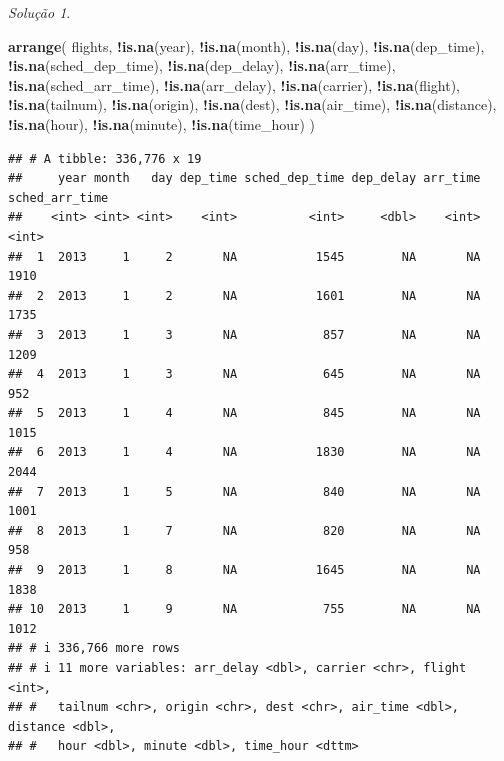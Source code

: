 \documentclass[
]{latex/krantz}
\newenvironment{Shaded}{\begin{snugshade}}{\end{snugshade}}
\newcommand{\FunctionTok}[1]{\textcolor[rgb]{0.13,0.29,0.53}{\textbf{#1}}}
\newcommand{\NormalTok}[1]{#1}
\newcommand{\SpecialCharTok}[1]{\textcolor[rgb]{0.81,0.36,0.00}{\textbf{#1}}}
\theoremstyle{definition}
\theoremstyle{definition}
\theoremstyle{definition}
\theoremstyle{definition}
\theoremstyle{remark}
\newtheorem*{solution}{Solução}
\begin{document}
\begin{solution}
\leavevmode

\begin{Shaded}
\begin{Highlighting}[]
\FunctionTok{arrange}\NormalTok{(}
\NormalTok{  flights, }
  \SpecialCharTok{!}\FunctionTok{is.na}\NormalTok{(year), }
  \SpecialCharTok{!}\FunctionTok{is.na}\NormalTok{(month), }
  \SpecialCharTok{!}\FunctionTok{is.na}\NormalTok{(day), }
  \SpecialCharTok{!}\FunctionTok{is.na}\NormalTok{(dep\_time), }
  \SpecialCharTok{!}\FunctionTok{is.na}\NormalTok{(sched\_dep\_time), }
  \SpecialCharTok{!}\FunctionTok{is.na}\NormalTok{(dep\_delay), }
  \SpecialCharTok{!}\FunctionTok{is.na}\NormalTok{(arr\_time), }
  \SpecialCharTok{!}\FunctionTok{is.na}\NormalTok{(sched\_arr\_time), }
  \SpecialCharTok{!}\FunctionTok{is.na}\NormalTok{(arr\_delay), }
  \SpecialCharTok{!}\FunctionTok{is.na}\NormalTok{(carrier), }
  \SpecialCharTok{!}\FunctionTok{is.na}\NormalTok{(flight), }
  \SpecialCharTok{!}\FunctionTok{is.na}\NormalTok{(tailnum), }
  \SpecialCharTok{!}\FunctionTok{is.na}\NormalTok{(origin), }
  \SpecialCharTok{!}\FunctionTok{is.na}\NormalTok{(dest), }
  \SpecialCharTok{!}\FunctionTok{is.na}\NormalTok{(air\_time), }
  \SpecialCharTok{!}\FunctionTok{is.na}\NormalTok{(distance), }
  \SpecialCharTok{!}\FunctionTok{is.na}\NormalTok{(hour), }
  \SpecialCharTok{!}\FunctionTok{is.na}\NormalTok{(minute), }
  \SpecialCharTok{!}\FunctionTok{is.na}\NormalTok{(time\_hour)}
\NormalTok{)}
\end{Highlighting}
\end{Shaded}

\begin{verbatim}
## # A tibble: 336,776 x 19
##     year month   day dep_time sched_dep_time dep_delay arr_time sched_arr_time
##    <int> <int> <int>    <int>          <int>     <dbl>    <int>          <int>
##  1  2013     1     2       NA           1545        NA       NA           1910
##  2  2013     1     2       NA           1601        NA       NA           1735
##  3  2013     1     3       NA            857        NA       NA           1209
##  4  2013     1     3       NA            645        NA       NA            952
##  5  2013     1     4       NA            845        NA       NA           1015
##  6  2013     1     4       NA           1830        NA       NA           2044
##  7  2013     1     5       NA            840        NA       NA           1001
##  8  2013     1     7       NA            820        NA       NA            958
##  9  2013     1     8       NA           1645        NA       NA           1838
## 10  2013     1     9       NA            755        NA       NA           1012
## # i 336,766 more rows
## # i 11 more variables: arr_delay <dbl>, carrier <chr>, flight <int>,
## #   tailnum <chr>, origin <chr>, dest <chr>, air_time <dbl>, distance <dbl>,
## #   hour <dbl>, minute <dbl>, time_hour <dttm>
\end{verbatim}

\end{solution}
\end{document}
